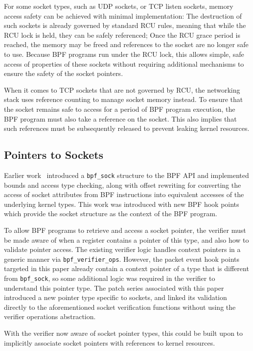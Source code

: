 \documentclass[10pt,sigconf,authorversion]{lpc}
\begin{document}
For some socket types, such as UDP sockets, or TCP listen sockets, memory
access safety can be achieved with minimal implementation: The destruction of
such sockets is already governed by standard RCU rules, meaning that while the
RCU lock is held, they can be safely referenced; Once the RCU grace period is
reached, the memory may be freed and references to the socket are no longer
safe to use. Because BPF programs run under the RCU lock, this allows simple,
safe access of properties of these sockets without requiring additional
mechanisms to ensure the safety of the socket pointers.

When it comes to TCP sockets that are not governed by RCU, the networking stack
uses reference counting to manage socket memory instead. To ensure that the
socket remains safe to access for a period of BPF program execution, the BPF
program must also take a reference on the socket. This also implies that such
references must be subsequently released to prevent leaking kernel resources.

\subsection{Pointers to Sockets}

Earlier work~\cite{bpf-sock} introduced a \verb+bpf_sock+ structure to the BPF
API and implemented bounds and access type checking, along with offset
rewriting for converting the access of socket attributes from BPF instructions
into equivalent accesses of the underlying kernel types. This work was
introduced with new BPF hook points which provide the socket structure as the
context of the BPF program.

To allow BPF programs to retrieve and access a socket pointer, the verifier
must be made aware of when a register contains a pointer of this type, and also
how to validate pointer access. The existing verifier logic handles context
pointers in a generic manner via \verb+bpf_verifier_ops+. However, the packet
event hook points targeted in this paper already contain a context pointer of a
type that is different from \verb+bpf_sock+, so some additional logic was
required in the verifier to understand this pointer type. The patch series
associated with this paper introduced a new pointer type specific to sockets,
and linked its validation directly to the aforementioned socket verification
functions without using the verifier operations abstraction.

With the verifier now aware of socket pointer types, this could be built upon
to implicitly associate socket pointers with references to kernel resources.
\end{document}
